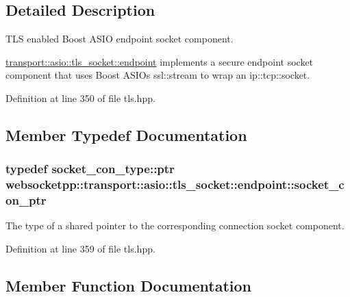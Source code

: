 \subsection{Detailed Description}
T\+LS enabled Boost A\+S\+IO endpoint socket component. 

\hyperlink{classwebsocketpp_1_1transport_1_1asio_1_1tls__socket_1_1endpoint}{transport\+::asio\+::tls\+\_\+socket\+::endpoint} implements a secure endpoint socket component that uses Boost A\+S\+IO\textquotesingle{}s ssl\+::stream to wrap an ip\+::tcp\+::socket. 

Definition at line 350 of file tls.\+hpp.



\subsection{Member Typedef Documentation}
\subsubsection[{\texorpdfstring{socket\+\_\+con\+\_\+ptr}{socket\_con\_ptr}}]{\setlength{\rightskip}{0pt plus 5cm}typedef {\bf socket\+\_\+con\+\_\+type\+::ptr} {\bf websocketpp\+::transport\+::asio\+::tls\+\_\+socket\+::endpoint\+::socket\+\_\+con\+\_\+ptr}}\hypertarget{classwebsocketpp_1_1transport_1_1asio_1_1tls__socket_1_1endpoint_ad0babd14e53524633840467d072710c3}{}\label{classwebsocketpp_1_1transport_1_1asio_1_1tls__socket_1_1endpoint_ad0babd14e53524633840467d072710c3}
The type of a shared pointer to the corresponding connection socket component. 

Definition at line 359 of file tls.\+hpp.



\subsection{Member Function Documentation}
